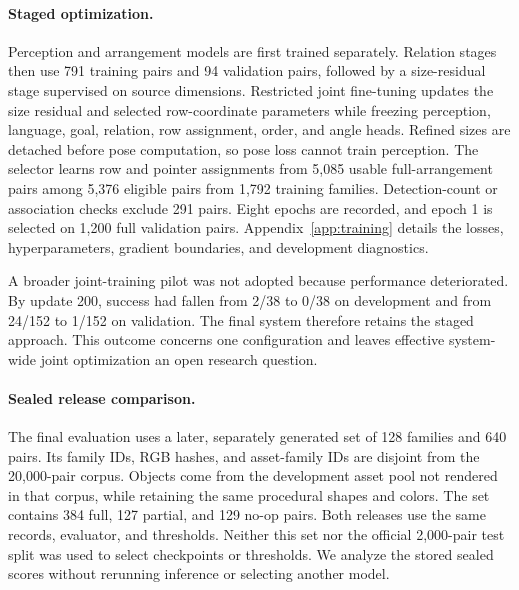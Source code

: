 \documentclass{article}
\begin{document}
\paragraph{Staged optimization.}
Perception and arrangement models are first trained separately. Relation stages then use 791 training pairs and 94 validation pairs, followed by a size-residual stage supervised on source dimensions. Restricted joint fine-tuning updates the size residual and selected row-coordinate parameters while freezing perception, language, goal, relation, row assignment, order, and angle heads. Refined sizes are detached before pose computation, so pose loss cannot train perception. The selector learns row and pointer assignments from 5,085 usable full-arrangement pairs among 5,376 eligible pairs from 1,792 training families. Detection-count or association checks exclude 291 pairs. Eight epochs are recorded, and epoch 1 is selected on 1,200 full validation pairs. Appendix~\ref{app:training} details the losses, hyperparameters, gradient boundaries, and development diagnostics.

A broader joint-training pilot was not adopted because performance deteriorated. By update 200, success had fallen from 2/38 to 0/38 on development and from 24/152 to 1/152 on validation. The final system therefore retains the staged approach. This outcome concerns one configuration and leaves effective system-wide joint optimization an open research question.

\paragraph{Sealed release comparison.}
The final evaluation uses a later, separately generated set of 128 families and 640 pairs. Its family IDs, RGB hashes, and asset-family IDs are disjoint from the 20,000-pair corpus. Objects come from the development asset pool not rendered in that corpus, while retaining the same procedural shapes and colors. The set contains 384 full, 127 partial, and 129 no-op pairs. Both releases use the same records, evaluator, and thresholds. Neither this set nor the official 2,000-pair test split was used to select checkpoints or thresholds. We analyze the stored sealed scores without rerunning inference or selecting another model.
\end{document}
